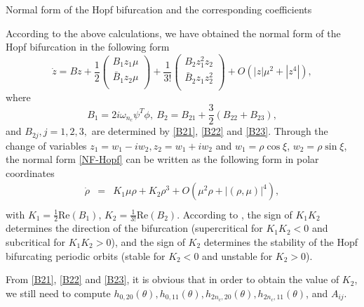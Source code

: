 \documentclass[11pt]{article}
\theoremstyle{definition}
\theoremstyle{remark}
\numberwithin{equation}{section}
\begin{document}
\vspace{0.2cm}
\begin{subsubsection}
{Normal form of the Hopf bifurcation and the corresponding coefficients}
\end{subsubsection}
 According to the above calculations, we have obtained the normal form of the Hopf bifurcation in the following form
\begin{equation}
\label{NF-Hopf}
  \dot{z}=Bz+\frac{1}{2}\left(
               \begin{array}{c}
                 B_1 z_1\mu \\
                 \bar{B}_1z_2\mu \\
               \end{array}
             \right)+\frac{1}{3!}\left(
                       \begin{array}{c}
                         B_2 z_1^2 z_2 \\
                         \bar{B}_2 z_1 z^2_2 \\
                       \end{array}
                     \right)+O(|z|\mu^2+|z^4|),
\end{equation}
where
$$B_1=2i\omega_{n_c}\psi^{T}\phi , ~B_2=B_{21}+\frac{3}{2}\left(B_{22}+B_{23} \right),$$
and $B_{2j}, j=1,2,3,$ are determined by  \eqref{B21}, \eqref{B22} and \eqref{B23}.
Through the change of
variables  $z_1=w_1-iw_2, z_2=w_1+iw_2$ and  $ w_1=\rho\cos\xi$, $w_2=\rho\sin\xi$, the normal form \eqref{NF-Hopf}  can be written as  the following form in polar
coordinates
$$
  \begin{array}{rcl}
   \dot{\rho} &=& K_1\mu\rho+K_2\rho^3+O(\mu^2\rho+|(\rho,\mu)|^4),\\
  \end{array}
  $$
with $K_1=\frac{1}{2}\textrm{Re}\left(B_1\right)$, $K_2=\frac{1}{3!}\textrm{Re}\left(B_2\right)$.
According to \cite{Chow-82}, the sign of $K_1K_2$ determines the direction
of the bifurcation (supercritical for $K_1K_2<0$  and subcritical for $K_1K_2>0$), and
  the sign of $K_2$  determines the stability of the Hopf bifurcating periodic orbits  (stable
for  $K_2<0$  and  unstable for $K_2>0$).



From \eqref{B21}, \eqref{B22} and \eqref{B23}, it is obvious that in order to obtain the value of $K_2$,
we still need to compute  $h_{0,20}(\theta), h_{0,11}(\theta), h_{2n_c, 20}(\theta), h_{2n_c, 11}(\theta)$, and $A_{ij}$.
\end{document}
